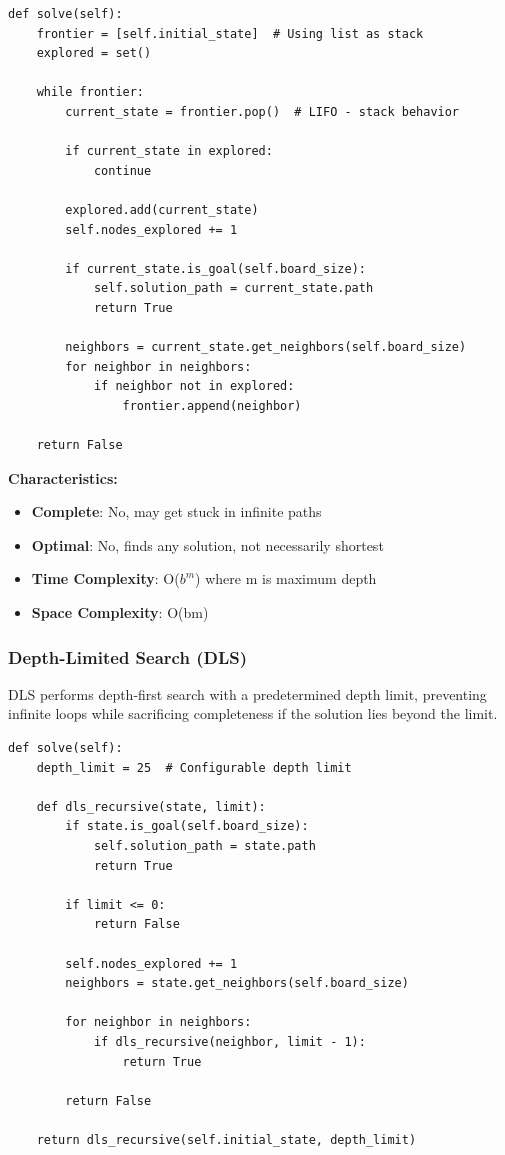 \documentclass[11pt,a4paper]{article}
\begin{document}
\begin{lstlisting}[caption=DFS Core Implementation]
def solve(self):
    frontier = [self.initial_state]  # Using list as stack
    explored = set()
    
    while frontier:
        current_state = frontier.pop()  # LIFO - stack behavior
        
        if current_state in explored:
            continue
            
        explored.add(current_state)
        self.nodes_explored += 1
        
        if current_state.is_goal(self.board_size):
            self.solution_path = current_state.path
            return True
            
        neighbors = current_state.get_neighbors(self.board_size)
        for neighbor in neighbors:
            if neighbor not in explored:
                frontier.append(neighbor)
                
    return False
\end{lstlisting}

\textbf{Characteristics:}
\begin{itemize}
\item \textbf{Complete}: No, may get stuck in infinite paths
\item \textbf{Optimal}: No, finds any solution, not necessarily shortest
\item \textbf{Time Complexity}: O($b^m$) where m is maximum depth
\item \textbf{Space Complexity}: O(bm)
\end{itemize}

\subsubsection{Depth-Limited Search (DLS)}

DLS performs depth-first search with a predetermined depth limit, preventing infinite loops while sacrificing completeness if the solution lies beyond the limit.

\begin{lstlisting}[caption=DLS Implementation with Depth Limit]
def solve(self):
    depth_limit = 25  # Configurable depth limit
    
    def dls_recursive(state, limit):
        if state.is_goal(self.board_size):
            self.solution_path = state.path
            return True
            
        if limit <= 0:
            return False
            
        self.nodes_explored += 1
        neighbors = state.get_neighbors(self.board_size)
        
        for neighbor in neighbors:
            if dls_recursive(neighbor, limit - 1):
                return True
                
        return False
    
    return dls_recursive(self.initial_state, depth_limit)
\end{lstlisting}
\end{document}
